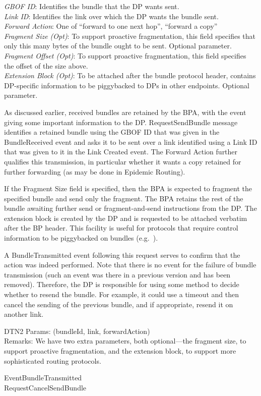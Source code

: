     
{
\metP
    {\em GBOF ID}: Identifies the bundle that the DP wants sent.\\
    {\em Link ID}: Identifies the link over which the DP wants the bundle
    sent.\\
    {\em Forward Action}: One of ``forward to one next hop'', ``forward a
    copy''\\
    {\em Fragment Size (Opt)}: To support proactive fragmentation, this field 
    specifies that only this many bytes of the bundle ought to be sent.
    Optional parameter.\\
    {\em Fragment Offset (Opt)}: To support proactive fragmentation, this 
    field specifies the offset of the size above.\\
    {\em Extension Block (Opt)}: To be attached after the bundle protocol 
    header, contains DP-specific information to be piggybacked to DPs in other
    endpoints. Optional parameter.

\metD
    As discussed earlier, received bundles are retained by the BPA, with
    the event giving some important information to the DP. RequestSendBundle
    message identifies a retained bundle using the GBOF ID that was given
    in the BundleReceived event and asks it to be sent over a link
    identified using a Link ID that was given to it in the Link Created
    event. The Forward Action further qualifies this transmission, in
    particular whether it wants a copy retained for further forwarding
    (as may be done in Epidemic Routing). 

    If the Fragment Size field is specified, then the BPA is expected
    to fragment the specified bundle and send only the fragment. The
    BPA retains the rest of the bundle awaiting further send or
    fragment-and-send instructions from the DP.  The extension block
    is created by the DP and is requested to be attached verbatim
    after the BP header. This facility is useful for protocols that
    require control information to be piggybacked on bundles
    (e.g.~\cite{MaxProp}).

    A BundleTransmitted event following this request serves to confirm
    that the action was indeed performed. Note that there is no event for
    the failure of bundle transmission (such an event was there in a previous
    version and has been removed). Therefore, the DP is responsible for
    using some method to decide whether to resend the bundle. For example,
    it could use a timeout and then cancel the sending of the previous 
    bundle, and if appropriate, resend it on another link. 


\metM
    DTN2 Params: (bundleId, link, forwardAction)\\
    Remarks: We have two extra parameters, both optional---the fragment
    size, to support proactive fragmentation, and the extension 
    block, to support more sophisticated routing protocols.

\metR
    EventBundleTransmitted\\
    RequestCancelSendBundle
}

